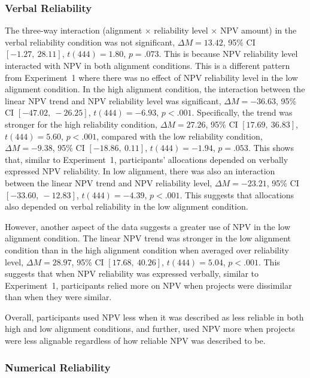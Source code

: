 \documentclass[a4paper, nobind]{templates/ociamthesis}
\theoremstyle{definition}
\theoremstyle{definition}
\theoremstyle{definition}
\theoremstyle{definition}
\theoremstyle{remark}
\begin{document}
\subsubsection{Verbal Reliability}

The three-way interaction (alignment \(\times\) reliability level \(\times\) NPV
amount) in the verbal reliability condition was not significant,
\(\Delta M = 13.42\), 95\% CI \([-1.27,~28.11]\), \(t(444) = 1.80\), \(p = .073\). This is
because NPV reliability level interacted with NPV in both alignment conditions.
This is a different pattern from Experiment~1 where there was no effect of NPV
reliability level in the low alignment condition. In the high alignment
condition, the interaction between the linear NPV trend and NPV reliability
level was significant,
\(\Delta M = -36.63\), 95\% CI \([-47.02,~-26.25]\), \(t(444) = -6.93\), \(p < .001\).
Specifically, the trend was stronger for the high reliability condition,
\(\Delta M = 27.26\), 95\% CI \([17.69,~36.83]\), \(t(444) = 5.60\), \(p < .001\),
compared with the low reliability condition,
\(\Delta M = -9.38\), 95\% CI \([-18.86,~0.11]\), \(t(444) = -1.94\), \(p = .053\).
This shows that, similar to Experiment~1, participants' allocations depended on
verbally expressed NPV reliability. In low alignment, there was also an
interaction between the linear NPV trend and NPV reliability level,
\(\Delta M = -23.21\), 95\% CI \([-33.60,~-12.83]\), \(t(444) = -4.39\), \(p < .001\).
This suggests that allocations also depended on verbal reliability in the low
alignment condition.

However, another aspect of the data suggests a greater use of NPV in the low
alignment condition. The linear NPV trend was stronger in the low
alignment condition than in the high alignment condition when averaged over
reliability level,
\(\Delta M = 28.97\), 95\% CI \([17.68,~40.26]\), \(t(444) = 5.04\), \(p < .001\). This
suggests that when NPV reliability was expressed verbally, similar to
Experiment~1, participants relied more on NPV when projects were dissimilar than
when they were similar.

Overall, participants used NPV less when it was described as less reliable in
both high and low alignment conditions, and further, used NPV more when projects
were less alignable regardless of how reliable NPV was described to be.

\subsubsection{Numerical Reliability}
\end{document}
